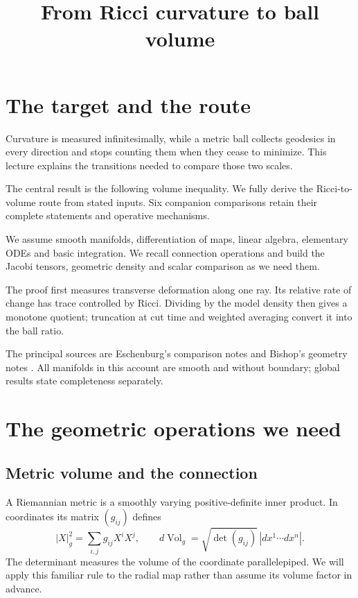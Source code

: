 \documentclass[12pt,reqno]{amsart}
\title{From Ricci curvature to ball volume}
\author{}
\date{}
\begin{document}
\raggedbottom
\maketitle

\section{The target and the route}
\label{sec:target}
Curvature is measured infinitesimally, while a metric ball collects geodesics in every direction and stops counting them when they cease to minimize. This lecture explains the transitions needed to compare those two scales.

The central result is the following volume inequality. We fully derive the Ricci-to-volume route from stated inputs. Six companion comparisons retain their complete statements and operative mechanisms.

\begin{samepage}
\begin{theorem}
\label{thm:volume}

\end{theorem}
\end{samepage}

We assume smooth manifolds, differentiation of maps, linear algebra, elementary ODEs and basic integration. We recall connection operations and build the Jacobi tensors, geometric density and scalar comparison as we need them.

The proof first measures transverse deformation along one ray. Its relative rate of change has trace controlled by Ricci. Dividing by the model density then gives a monotone quotient; truncation at cut time and weighted averaging convert it into the ball ratio.

The principal sources are Eschenburg's comparison notes and Bishop's geometry notes \cite{S-Eschenburg-1994,S-Bishop-2013v2}. All manifolds in this account are smooth and without boundary; global results state completeness separately.

\section{The geometric operations we need}
\label{sec:operations}

\subsection{Metric volume and the connection}
A Riemannian metric is a smoothly varying positive-definite inner product. In coordinates its matrix \((g_{ij})\) defines
\[
|X|_g^2=\sum_{i,j}g_{ij}X^iX^j,
\qquad d\operatorname{Vol}_g=\sqrt{\det(g_{ij})}\,|dx^1\cdots dx^n|.
\]
The determinant measures the volume of the coordinate parallelepiped. We will apply this familiar rule to the radial map rather than assume its volume factor in advance.
\end{document}

